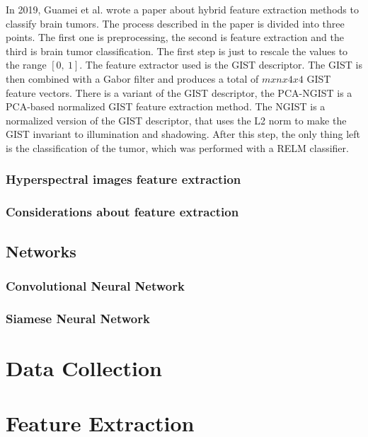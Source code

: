 \documentclass[conference]{IEEEtran}
\begin{document}
			\noindent In 2019, Guamei et al. wrote a paper about hybrid feature extraction methods to classify brain tumors. The process described in the paper is divided into three points. The 
			first one is preprocessing, the second is feature extraction and the third is brain tumor classification. The first step is just to rescale the values to the range $[0,\ 1]$. The feature extractor 
			used is the GIST descriptor. The GIST is then combined with a Gabor filter and produces a total of $mxnx4x4$ GIST feature vectors. There is a variant of the GIST descriptor, the 
			PCA-NGIST is a PCA-based normalized GIST feature extraction method. The NGIST is a normalized version of the GIST descriptor, that uses the L2 norm to make the GIST invariant to illumination and shadowing. 
			After this step, the only thing left is the classification of the tumor, which was performed with a RELM classifier. 
			
		\subsubsection{Hyperspectral images feature extraction}
			
			

		\subsubsection{Considerations about feature extraction}
		
		
		\subsection{Networks}
		
		\subsubsection{Convolutional Neural Network}
		
		\subsubsection{Siamese Neural Network}


\section{Data Collection}
\section{Feature Extraction}
\end{document}
